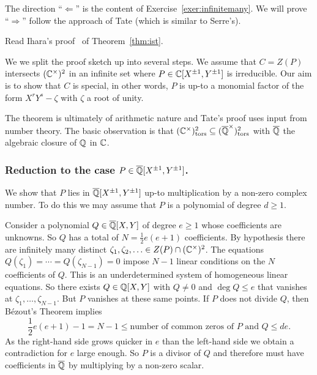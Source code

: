 The direction ``$\Longleftarrow$'' is the content of
Exercise~\ref{exer:infinitemany}. We will prove ``$\Longrightarrow$''
follow the approach of Tate (which is similar to Serre's).

\begin{exercise}
  Read Ihara's proof~\cite{Lang:Division} of Theorem~\ref{thm:ist}.
\end{exercise}

We we split the proof sketch up into several steps. We assume that
$C=Z(P)$ intersects $({\mathbb{C}}^\times)^2$ in an infinite set where $P\in
{\mathbb{C}}[X^{\pm 1},Y^{\pm 1}]$ is irreducible.
Our aim is to show that $C$ is special, in other words, $P$ is up-to a
monomial factor of the form $X^rY^s-\zeta$ with $\zeta$ a root of
unity. 

The theorem is ultimately of arithmetic nature and Tate's proof uses
input from number theory. The basic observation is that
$({\mathbb{C}}^\times)^2_{\mathrm{tors}}\subseteq
({\overline{\mathbb{Q}}}^\times)^2_{\mathrm{tors}}$ with ${\overline{\mathbb{Q}}}$ the algebraic closure
of ${\mathbb{Q}}$ in ${\mathbb{C}}$.

\subsubsection{Reduction to the case $P \in {\overline{\mathbb{Q}}}[X^{\pm
    1},Y^{\pm 1}]$.}

We show that $P$ lies in ${\overline{\mathbb{Q}}}[X^{\pm 1},Y^{\pm 1}]$ up-to
multiplication by a non-zero complex number. To do this we may assume
that $P$ is a polynomial of degree $d\ge 1$.

Consider a polynomial $Q\in
{\overline{\mathbb{Q}}}[X,Y]$ of degree $e\ge 1$ whose coefficients are unknowns. So
$Q$ has a total of $N = \frac 12 e(e+1)$ coefficients. 
By hypothesis there are infinitely many distinct
$\zeta_1,\zeta_2,\ldots \in Z(P)\cap ({\mathbb{C}}^\times)^2$.
The equations $Q(\zeta_1) = \cdots = Q(\zeta_{N-1})=0$
impose $N-1$ linear conditions on the $N$ coefficients of
$Q$.
This is an underdetermined system of homogeneous linear equations. So
there exists $Q\in {\mathbb{Q}}[X,Y]$ with $Q\not=0$  and $\deg Q \le e$ that vanishes at
$\zeta_1,\ldots,\zeta_{N-1}$. But $P$ vanishes at these same points.
If $P$ does not divide $Q$, then B\'ezout's Theorem implies
\begin{equation*}
  \frac 12 e(e+1)-1=  N-1 \le \text{number of common zeros of $P$ and $Q$} \le de.
\end{equation*}
As the right-hand side grows quicker in $e$ than the left-hand side we obtain a
contradiction for $e$ large enough. So $P$ is a divisor of $Q$ and
therefore must have coefficients in ${\overline{\mathbb{Q}}}$ by multiplying by a non-zero
scalar. 


